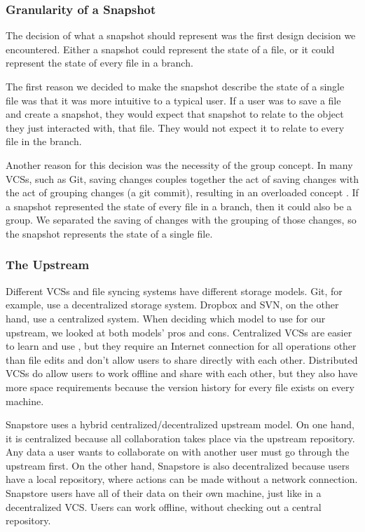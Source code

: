 \subsubsection{Granularity of a Snapshot}

The decision of what a snapshot should represent was the first design decision we encountered. Either a snapshot could represent the state of a file, or it could represent the state of every file in a branch. 

The first reason we decided to make the snapshot describe the state of a single file was that it was more intuitive to a typical user. If a user was to save a file and create a snapshot, they would expect that snapshot to relate to the object they just interacted with, that file. They would not expect it to relate to every file in the branch.

Another reason for this decision was the necessity of the group concept. In many VCSs, such as Git, saving changes couples together the act of saving changes with the act of grouping changes (a git commit), resulting in an overloaded concept \cite{Jackson}. If a snapshot represented the state of every file in a branch, then it could also be a group. We separated the saving of changes with the grouping of those changes, so the snapshot represents the state of a single file.

\subsubsection{The Upstream}

Different VCSs and file syncing systems have different storage models. Git, for example, use a decentralized storage system. Dropbox and SVN, on the other hand, use a centralized system. When deciding which model to use for our upstream, we looked at both models' pros and cons. Centralized VCSs are easier to learn and use \cite{Brindescu}, but they require an Internet connection for all operations other than file edits and don't allow users to share directly with each other. Distributed VCSs do allow users to work offline and share with each other, but they also have more space requirements because the version history for every file exists on every machine.

Snapstore uses a hybrid centralized/decentralized upstream model. On one hand, it is centralized because all collaboration takes place via the upstream repository. Any data a user wants to collaborate on with another user must go through the upstream first. On the other hand, Snapstore is also decentralized because users have a local repository, where actions can be made without a network connection. Snapstore users have all of their data on their own machine, just like in a decentralized VCS. Users can work offline, without checking out a central repository.


